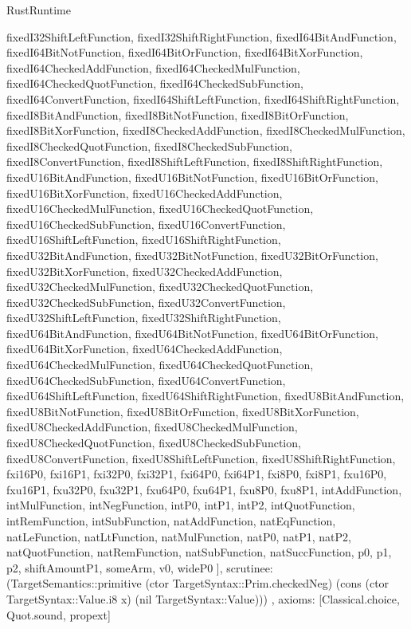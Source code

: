 \begin{lexlean}{RustRuntime}
\begin{semanticmodule}
{{      fixedI32ShiftLeftFunction,
      fixedI32ShiftRightFunction,
      fixedI64BitAndFunction,
      fixedI64BitNotFunction,
      fixedI64BitOrFunction,
      fixedI64BitXorFunction,
      fixedI64CheckedAddFunction,
      fixedI64CheckedMulFunction,
      fixedI64CheckedQuotFunction,
      fixedI64CheckedSubFunction,
      fixedI64ConvertFunction,
      fixedI64ShiftLeftFunction,
      fixedI64ShiftRightFunction,
      fixedI8BitAndFunction,
      fixedI8BitNotFunction,
      fixedI8BitOrFunction,
      fixedI8BitXorFunction,
      fixedI8CheckedAddFunction,
      fixedI8CheckedMulFunction,
      fixedI8CheckedQuotFunction,
      fixedI8CheckedSubFunction,
      fixedI8ConvertFunction,
      fixedI8ShiftLeftFunction,
      fixedI8ShiftRightFunction,
      fixedU16BitAndFunction,
      fixedU16BitNotFunction,
      fixedU16BitOrFunction,
      fixedU16BitXorFunction,
      fixedU16CheckedAddFunction,
      fixedU16CheckedMulFunction,
      fixedU16CheckedQuotFunction,
      fixedU16CheckedSubFunction,
      fixedU16ConvertFunction,
      fixedU16ShiftLeftFunction,
      fixedU16ShiftRightFunction,
      fixedU32BitAndFunction,
      fixedU32BitNotFunction,
      fixedU32BitOrFunction,
      fixedU32BitXorFunction,
      fixedU32CheckedAddFunction,
      fixedU32CheckedMulFunction,
      fixedU32CheckedQuotFunction,
      fixedU32CheckedSubFunction,
      fixedU32ConvertFunction,
      fixedU32ShiftLeftFunction,
      fixedU32ShiftRightFunction,
      fixedU64BitAndFunction,
      fixedU64BitNotFunction,
      fixedU64BitOrFunction,
      fixedU64BitXorFunction,
      fixedU64CheckedAddFunction,
      fixedU64CheckedMulFunction,
      fixedU64CheckedQuotFunction,
      fixedU64CheckedSubFunction,
      fixedU64ConvertFunction,
      fixedU64ShiftLeftFunction,
      fixedU64ShiftRightFunction,
      fixedU8BitAndFunction,
      fixedU8BitNotFunction,
      fixedU8BitOrFunction,
      fixedU8BitXorFunction,
      fixedU8CheckedAddFunction,
      fixedU8CheckedMulFunction,
      fixedU8CheckedQuotFunction,
      fixedU8CheckedSubFunction,
      fixedU8ConvertFunction,
      fixedU8ShiftLeftFunction,
      fixedU8ShiftRightFunction,
      fxi16P0,
      fxi16P1,
      fxi32P0,
      fxi32P1,
      fxi64P0,
      fxi64P1,
      fxi8P0,
      fxi8P1,
      fxu16P0,
      fxu16P1,
      fxu32P0,
      fxu32P1,
      fxu64P0,
      fxu64P1,
      fxu8P0,
      fxu8P1,
      intAddFunction,
      intMulFunction,
      intNegFunction,
      intP0,
      intP1,
      intP2,
      intQuotFunction,
      intRemFunction,
      intSubFunction,
      natAddFunction,
      natEqFunction,
      natLeFunction,
      natLtFunction,
      natMulFunction,
      natP0,
      natP1,
      natP2,
      natQuotFunction,
      natRemFunction,
      natSubFunction,
      natSuccFunction,
      p0,
      p1,
      p2,
      shiftAmountP1,
      someArm,
      v0,
      wideP0
    ],
    scrutinee: (TargetSemantics::primitive (ctor TargetSyntax::Prim.checkedNeg) (cons (ctor TargetSyntax::Value.i8 x) (nil TargetSyntax::Value)))
  },
  axioms: [Classical.choice, Quot.sound, propext]
}


\end{semanticmodule}
\end{lexlean}
